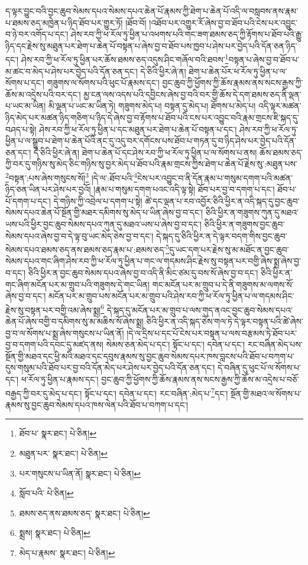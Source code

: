 ད་ལྟར་བྱུང་བའི་བྱང་ཆུབ་སེམས་དཔའ་སེམས་དཔའ་ཆེན་པོ་རྣམས་ཀྱི་ཐེག་པ་ཆེན་པོ་འདི་ལ་བསླབས་ནས་རྣམ་པ་ཐམས་ཅད་མཁྱེན་པ་ཉིད་ཐོབ་པར་གྱུར་ཏོ། །ཐོབ་བོ། །འཐོབ་པར་འགྱུར་རོ་ཞེས་བྱ་བ་ཐོབ་པའི་ངེས་པར་འབྱུང་བ་ཉེ་བར་འགོད་པ་དང་། ཤེས་རབ་ཀྱི་ཕ་རོལ་ཏུ་ཕྱིན་པ་འཕགས་པའི་གང་ཟག་ཐམས་ཅད་ཀྱི་རྟོགས་པ་ཐོབ་པའི་རྒྱུ་ཉིད་དང་རྗེས་སུ་མཐུན་པར་ཐེག་པ་ཆེན་པོ་བསྟན་པ་ཞེས་བྱ་བ་ཐོབ་པས་ཁྱབ་པ་ཤེས་པར་བྱེད་པའི་དོན་ཅན་ཉིད་དང་། ཤེས་རབ་ཀྱི་ཕ་རོལ་ཏུ་ཕྱིན་པར་ཆོས་ཐམས་ཅད་འདུས་ཤིང་གཞོལ་བའི་ཐབས་\footnote{ཐོབ་པ་  སྣར་ཐང་།  པེ་ཅིན། }བསྟན་པ་ཞེས་བྱ་བ་ཐོབ་པ་མ་ཚང་བ་མེད་པ་ཤེས་པར་བྱེད་པའི་དོན་ཅན་དང་། དེ་ཅིའི་ཕྱིར་ཞེ་ན། ཐེག་པ་ཆེན་པོར་ཕ་རོལ་ཏུ་ཕྱིན་པ་ལ་སོགས་པ་དང་། གཟུགས་ལ་སོགས་པའི་ཕུང་པོ་རྣམས་དང་། བྱང་ཆུབ་ཀྱི་ཕྱོགས་ཀྱི་ཆོས་རྣམས་ནས་སངས་རྒྱས་ཀྱི་ཆོས་མ་འདྲེས་པའི་བར་དང་། མྱ་ངན་ལས་འདས་པའི་དབྱིངས་ཞེས་བྱ་བའི་བར་གྱི་ཆོས་དེ་དག་ཐམས་ཅད་ནི་ལྡན་པ་ཡང་མ་ཡིན། མི་ལྡན་པ་ཡང་མ་ཡིན་ཏེ། གཟུགས་མེད་པ། བསྟན་དུ་མེད་པ། ཐོགས་པ་མེད་པ། འདི་ལྟར་མཚན་ཉིད་མེད་པར་མཚན་ཉིད་གཅིག་པ་ཉིད་དེ་ཞེས་བྱ་བ་རྟོགས་པ་ཐོབ་པའི་ངས་པར་འབྱུང་བའི་རྣམ་གྲངས་ཇི་སྐད་དུ་བཤད་པ་སྟེ། ཤེས་རབ་ཀྱི་ཕ་རོལ་ཏུ་ཕྱིན་པ་དང་མཐུན་པར་ཐེག་པ་ཆེན་པོ་བསྟན་པ་དང་། ཤེས་རབ་ཀྱི་ཕ་རོལ་ཏུ་ཕྱིན་པ་ལ་སྒྲུབ་པ་ཐེག་པ་ཆེན་པོའི་ནང་དུ་འདུ་བར་དགོངས་པས་ཐོབ་པ་གཏན་དུ་བ་ཉིད་ཤེས་པར་བྱེད་པའི་དོན་ཅན་དང་། དེ་ཅིའི་ཕྱིར་ཞེ་ན། ཐེག་པ་ཆེན་པོ་དང་ཤེས་རབ་ཀྱི་ཕ་རོལ་ཏུ་ཕྱིན་པ་ལ་སོགས་པ་ནས། ཆོས་ཐམས་ཅད་ཀྱི་བར་དུ་གཉིས་སུ་མེད་ཅིང་གཉིས་སུ་བྱར་མེད་པ་ཐོབ་པའི་རྣམ་གྲངས་ཀྱིས་ཐེག་པ་ཆེན་པོ་རྗེས་སུ་:མཐུན་པས་\footnote{མཐུན་པར་  སྣར་ཐང་།  པེ་ཅིན། }བསྟན་:པས་ཞེས་གསུངས་སོ།\footnote{པར་གསུངས་པ་ཡིན་ནོ།  སྣར་ཐང་།  པེ་ཅིན། } །དེ་ལ་:ཐོབ་པའི་\footnote{སློབ་པའི་  པེ་ཅིན། }ངེས་པར་འབྱུང་བ་ནི་དོན་རྣམ་པ་གསུམ་དགག་པའི་མཚན་ཉིད་ཅན་ཡིན་པར་ཤེས་པར་བྱའོ། །རྣམ་པ་གསུམ་དགག་པའང་འདི་ལྟ་སྟེ། ཐོབ་པར་བྱ་བ་དགག་པ་དང་། ཐོབ་པ་པོ་དགག་པ་དང་། དེ་གཉིས་ཀྱི་འབྲེལ་པ་དགག་པ་སྟེ། ཚེ་དང་ལྡན་པ་རབ་འབྱོར་ཅིའི་ཕྱིར་ན་འདི་སྐད་དུ་བྱང་ཆུབ་སེམས་དཔའ་ཆེན་པོ་སྔོན་གྱི་མཐར་དམིགས་སུ་མེད་པ་ཡིན་ཞེས་བྱ་བ་དང་། ཅིའི་ཕྱིར་ན་གཟུགས་ཀུན་དུ་མཐའ་ཡས་པའི་ཕྱིར་བྱང་ཆུབ་སེམས་དཔའ་ཀུན་དུ་མཐའ་ཡས་པ་ཞེས་བྱ་བ་དང་། ཅིའི་ཕྱིར་ན་གཟུགས་བྱང་ཆུབ་སེམས་དཔའ་ཞེས་བྱ་བ་དེ་ལྟ་བུ་ཡང་མེད་ཅེས་བྱ་བ་དང་། དེ་སྐད་དུ་ཅིའི་ཕྱིར་ན་དེ་ལྟར་བདག་གིས་བྱང་ཆུབ་སེམས་དཔའ་ཐམས་ཅད་ནས་ཐམས་ཅད་རྣམ་པ་:ཐམས་ཅད་\footnote{ཐམས་ཅད་ནས་ཐམས་ཅད་  སྣར་ཐང་།  པེ་ཅིན། }དུ་ཡང་དག་པར་རྗེས་སུ་མ་མཐོང་ན་བྱང་ཆུབ་སེམས་དཔའ་གང་ཞིག་ཤེས་རབ་ཀྱི་ཕ་རོལ་ཏུ་ཕྱིན་པ་གང་ལ་གདམས་ཤིང་རྗེས་སུ་བསྟན་པར་བགྱི་ཞེས་སྨྲ་ཞེས་བྱ་བ་དང་། ཅིའི་ཕྱིར་ན་བྱང་ཆུབ་སེམས་དཔའ་ཞེས་བྱ་བ་འདི་ནི་མིང་ཙམ་དུ་བས་སོ་ཞེས་བྱ་བ་དང་། ཅིའི་ཕྱིར་ན་གང་ཞིག་མངོན་པར་མ་གྲུབ་པའི་གཟུགས་དེ་གང་ཡིན། གང་མངོན་པར་མ་གྲུབ་པ་དེ་ནི་གཟུགས་མ་ལགས་སོ་ཞེས་བྱ་བ་དང་། མངོན་པར་མ་གྲུབ་པས་མངོན་པར་མ་གྲུབ་པའི་ཤེས་རབ་ཀྱི་ཕ་རོལ་ཏུ་ཕྱིན་པ་ལ་གདམས་ཤིང་རྗེས་སུ་བསྟན་པར་བགྱི་འམ་ཞེས་སྨྲ།\footnote{སྨྲས།  སྣར་ཐང་།  པེ་ཅིན། } དེ་སྐད་དུ་མངོན་པར་མ་གྲུབ་པ་ལས་གུད་ནའང་བྱང་ཆུབ་སེམས་དཔའ་ཆེན་པོ་ཞེས་བགྱི་བ་དམིགས་སུ་མ་མཆིས་སོ་ཞེས་སྨྲ། ཅིའི་ཕྱིར་ན་འདི་སྐད་ཅེས་གལ་ཏེ་དེ་ལྟར་བསྟན་པའི་ཚེ་ཞེས་བྱ་བ་ལ་སོགས་པ་སྨྲ་ཞེས་གསུངས་པ་ཡིན་ནོ། །དེ་ལ་དྲིས་པ་དང་པོ་ངེས་པར་བསྟན་པ་ལས་བརྩམས་ཏེ་ཐོབ་པར་བྱ་བ་དགག་པའི་དབང་དུ་མཛད་ནས། སེམས་ཅན་མེད་པ་དང་། སྟོང་པ་དང་། དབེན་པ་དང་། རང་བཞིན་མེད་པས་སྔོན་གྱི་མཐའ་དང་ཕྱི་མའི་མཐའ་དང་དབུས་རྣམས་སུ་བྱང་ཆུབ་སེམས་དཔར་ཁས་བླངས་པའི་ཐོབ་པ་བཀག་པ་དུས་གསུམ་པའི་ཐོབ་པར་བྱ་བའི་དོན་མེད་པར་ཤེས་པར་བྱེད་པའི་དོན་ཅན་དང་། དེ་བཞིན་དུ་ཕུང་པོ་ལ་སོགས་པ་དང་། ཕ་རོལ་ཏུ་ཕྱིན་པ་རྣམས་དང་། བྱང་ཆུབ་ཀྱི་ཕྱོགས་ཀྱི་ཆོས་རྣམས་ནས་སངས་རྒྱས་ཀྱི་ཆོས་མ་འདྲེས་པ་བཅོ་བརྒྱད་ཀྱི་བར་དུ་མེད་པ་དང་། སྟོང་པ་དང་། དབེན་པ་དང་། རང་བཞིན་:མེད་པ་\footnote{མེད་པ་རྣམས་  སྣར་ཐང་།  པེ་ཅིན། }དང་། སྔོན་གྱི་མཐའ་ལ་སོགས་པ་རྣམས་སུ་བྱང་ཆུབ་སེམས་དཔའ་ཁས་ལེན་པའི་ཐོབ་པ་བཀག་པ་དང་། 